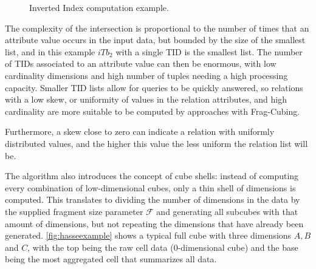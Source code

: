 \begin{figure}[!htb]
  \caption{Inverted Index computation example.}\label{fig:fragexample}
  \vspace{2mm}
  \begin{center}
  \end{center}
  \vspace{1mm}
  \legenda{}
\end{figure}

The complexity of the intersection is proportional to the number of times that an attribute value occurs in the input data, but bounded by the size of the smallest list, and in this example $iTb_2$ with a single TID is the smallest list.
The number of TIDs associated to an attribute value can then be enormous, with low cardinality dimensions and high number of tuples needing a high processing capacity.
Smaller TID lists allow for queries to be quickly answered, so relations with a low skew, or uniformity of values in the relation attributes, and high cardinality are more suitable to be computed by approaches with Frag-Cubing.

Furthermore, a skew close to zero can indicate a relation with uniformly distributed values, and the higher this value the less uniform the relation list will be.

The algorithm also introduces the concept of cube shells: instead of computing every combination of low-dimensional cubes, only a thin shell of dimensions is computed.
This translates to dividing the number of dimensions in the data by the supplied fragment size parameter $\mathcal{F}$ and generating all subcubes with that amount of dimensions, but not repeating the dimensions that have already been generated.
\autoref{fig:hasseexample} shows a typical full cube with three dimensions $A, B$ and $C$, with the top being the raw cell data ($0$-dimensional cube) and the base being the most aggregated cell that summarizes all data.

